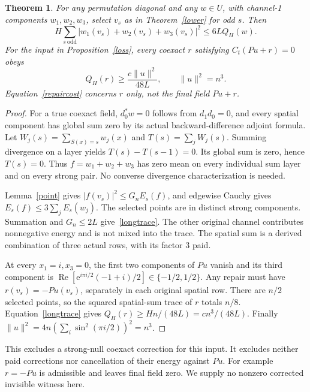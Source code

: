 \documentclass[11pt,a4paper]{article}
\newtheorem{theorem}{Theorem}[section]
\newcommand{\norm}[1]{\lVert#1\rVert}
\newcommand{\Rea}{\operatorname{Re}}
\newcommand{\e}{\mathrm e}
\begin{document}
\begin{theorem}\label{repair}
For any permutation diagonal and any $w\in U$, with channel-1 components
$w_1,w_2,w_3$, select $v_s$ as in Theorem~\ref{lower} for odd $s$. Then
\begin{equation}\label{longtrace}
 H\sum_{s\ \mathrm{odd}}|w_1(v_s)+w_2(v_s)+w_3(v_s)|^2
                                                \leq6LQ_H(w).
\end{equation}
For the input in Proposition~\ref{loss}, every coexact $r$ satisfying
$C_t(Pu+r)=0$ obeys
\begin{equation}\label{repaircost}
 Q_H(r)\geq\frac{c\norm u^2}{48L},\qquad \norm u^2=n^3.
\end{equation}
Equation~\eqref{repaircost} concerns $r$ only, not the final field $Pu+r$.
\end{theorem}
\begin{proof}
For a true coexact field, $d_0^*w=0$ follows from $d_1d_0=0$, and every
spatial component has global sum zero by its actual backward-difference
adjoint formula. Let $W_j(s)=\sum_{S(x)=s}w_j(x)$ and
$T(s)=\sum_jW_j(s)$. Summing divergence on a layer yields
$T(s)-T(s-1)=0$. Its global sum is zero, hence $T(s)=0$.
Thus $f=w_1+w_2+w_3$ has zero mean on every individual sum layer and on
every strong pair. No converse divergence characterization is needed.

Lemma~\ref{point} gives $|f(v_s)|^2\leq G_nE_s(f)$, and edgewise
Cauchy gives $E_s(f)\leq3\sum_jE_s(w_j)$. The selected points are in
distinct strong components. Summation and $G_n\leq2L$ give~\eqref{longtrace}.
The other original channel contributes nonnegative energy and is not mixed
into the trace. The spatial sum is a derived combination of three actual
rows, with its factor 3 paid.

At every $x_1=i,x_3=0$, the first two components of $Pu$ vanish and its
third component is
$\Rea[\e^{i\pi i/2}(-1+i)/2]\in\{-1/2,1/2\}$.
Any repair must have $r(v_s)=-Pu(v_s)$, separately in each original spatial
row. There are $n/2$ selected points, so the squared spatial-sum trace of
$r$ totals $n/8$. Equation~\eqref{longtrace} gives
$Q_H(r)\geq Hn/(48L)=cn^3/(48L)$. Finally
$\norm u^2=4n(\sum_i\sin^2(\pi i/2))^2=n^3$.
\end{proof}

This excludes a strong-null coexact correction for this input. It excludes
neither paid corrections nor cancellation of their energy against $Pu$.
For example $r=-Pu$ is admissible and leaves final field zero. We supply
no nonzero corrected invisible witness here.
\end{document}
